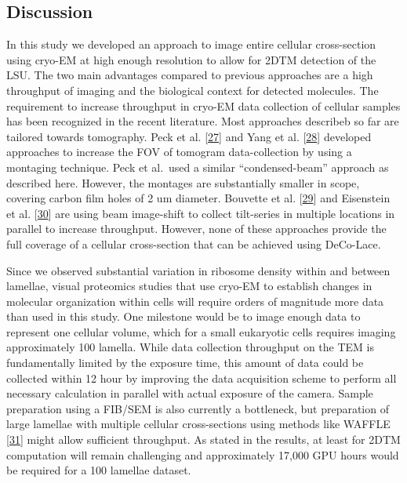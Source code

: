 \documentclass[
]{article}
\begin{document}
\hypertarget{discussion}{%
\subsection{Discussion}\label{discussion}}

In this study we developed an approach to image entire cellular cross-section using cryo-EM at high enough resolution to allow for 2DTM detection of the LSU. The two main advantages compared to previous approaches are a high throughput of imaging and the biological context for detected molecules. The requirement to increase throughput in cryo-EM data collection of cellular samples has been recognized in the recent literature. Most approaches describeb so far are tailored towards tomography. Peck et al. {[}\protect\hyperlink{ref-1GPPSX111}{27}{]} and Yang et al. {[}\protect\hyperlink{ref-ujizcpVn}{28}{]} developed approaches to increase the FOV of tomogram data-collection by using a montaging technique. Peck et al.~used a similar ``condensed-beam'' approach as described here. However, the montages are substantially smaller in scope, covering carbon film holes of 2 um diameter. Bouvette et al. {[}\protect\hyperlink{ref-1Gwx5ScUa}{29}{]} and Eisenstein et al. {[}\protect\hyperlink{ref-xvouNMBy}{30}{]} are using beam image-shift to collect tilt-series in multiple locations in parallel to increase throughput. However, none of these approaches provide the full coverage of a cellular cross-section that can be achieved using DeCo-Lace.

Since we observed substantial variation in ribosome density within and between lamellae, visual proteomics studies that use cryo-EM to establish changes in molecular organization within cells will require orders of magnitude more data than used in this study. One milestone would be to image enough data to represent one cellular volume, which for a small eukaryotic cells requires imaging approximately 100 lamella. While data collection throughput on the TEM is fundamentally limited by the exposure time, this amount of data could be collected within 12 hour by improving the data acquisition scheme to perform all necessary calculation in parallel with actual exposure of the camera. Sample preparation using a FIB/SEM is also currently a bottleneck, but preparation of large lamellae with multiple cellular cross-sections using methods like WAFFLE {[}\protect\hyperlink{ref-17H2LWiIu}{31}{]} might allow sufficient throughput. As stated in the results, at least for 2DTM computation will remain challenging and approximately 17,000 GPU hours would be required for a 100 lamellae dataset.
\end{document}
